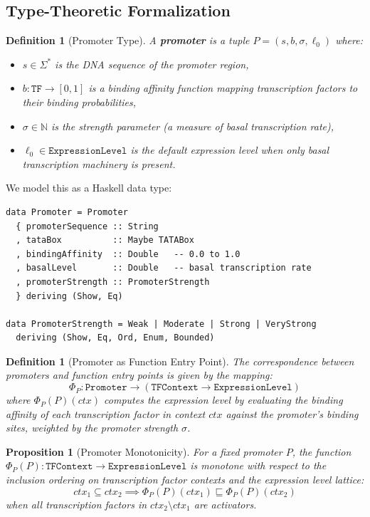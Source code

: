 \documentclass[12pt,a4paper]{article}
\newtheorem{proposition}[theorem]{Proposition}
\newtheorem{definition}[theorem]{Definition}
\newcommand{\ExprLevel}{\texttt{ExpressionLevel}}
\begin{document}
\subsection{Type-Theoretic Formalization}

\begin{definition}[Promoter Type]\label{def:promoter}
A \textbf{promoter} is a tuple $P = (s, b, \sigma, \ell_0)$ where:
\begin{itemize}
  \item $s \in \Sigma^*$ is the DNA sequence of the promoter region,
  \item $b : \texttt{TF} \to [0,1]$ is a \emph{binding affinity function} mapping transcription factors to their binding probabilities,
  \item $\sigma \in \mathbb{N}$ is the \emph{strength parameter} (a measure of basal transcription rate),
  \item $\ell_0 \in \ExprLevel$ is the \emph{default expression level} when only basal transcription machinery is present.
\end{itemize}
\end{definition}

We model this as a Haskell data type:

\begin{lstlisting}[caption={Promoter type definition}]
data Promoter = Promoter
  { promoterSequence :: String
  , tataBox          :: Maybe TATABox
  , bindingAffinity  :: Double   -- 0.0 to 1.0
  , basalLevel       :: Double   -- basal transcription rate
  , promoterStrength :: PromoterStrength
  } deriving (Show, Eq)

data PromoterStrength = Weak | Moderate | Strong | VeryStrong
  deriving (Show, Eq, Ord, Enum, Bounded)
\end{lstlisting}

\begin{definition}[Promoter as Function Entry Point]\label{def:promoter-entry}
The correspondence between promoters and function entry points is given by the mapping:
\[
\Phi_P : \texttt{Promoter} \to (\texttt{TFContext} \to \ExprLevel)
\]
where $\Phi_P(P)(ctx)$ computes the expression level by evaluating the binding affinity of each transcription factor in context $ctx$ against the promoter's binding sites, weighted by the promoter strength $\sigma$.
\end{definition}

\begin{proposition}[Promoter Monotonicity]\label{prop:promoter-mono}
For a fixed promoter $P$, the function $\Phi_P(P) : \texttt{TFContext} \to \ExprLevel$ is monotone with respect to the inclusion ordering on transcription factor contexts and the expression level lattice:
\[
ctx_1 \subseteq ctx_2 \implies \Phi_P(P)(ctx_1) \sqsubseteq \Phi_P(P)(ctx_2)
\]
when all transcription factors in $ctx_2 \setminus ctx_1$ are activators.
\end{proposition}
\end{document}
